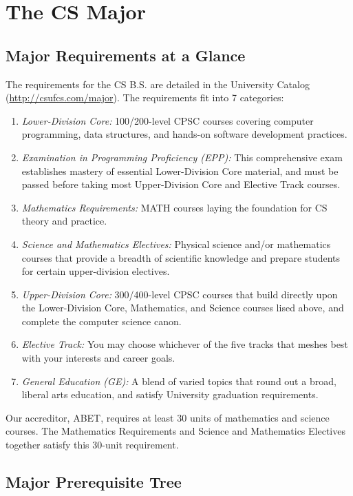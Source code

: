 \documentclass{book}
\newcommand{\shrunkurl}[1]{\url{http://csufcs.com/#1}}
\begin{document}
\chapter{The CS Major}

\section{Major Requirements at a Glance}

The requirements for the CS B.S. are detailed in the University Catalog (\shrunkurl{major}). The requirements fit into 7 categories:
\begin{enumerate}
\item \emph{Lower-Division Core:} 100/200-level CPSC courses covering computer programming, data structures, and hands-on software development practices.
\item \emph{Examination in Programming Proficiency (EPP):} This comprehensive exam establishes mastery of essential Lower-Division Core material, and must be passed before taking most Upper-Division Core and Elective Track courses. 
\item \emph{Mathematics Requirements:} MATH courses laying the foundation for CS theory and practice.
\item \emph{Science and Mathematics Electives:} Physical science and/or mathematics courses that provide a breadth of scientific knowledge and prepare students for certain upper-division electives.
\item \emph{Upper-Division Core:} 300/400-level CPSC courses that build directly upon the Lower-Division Core, Mathematics, and Science courses lised above, and complete the computer science canon.
\item \emph{Elective Track:} You may choose whichever of the five tracks that meshes best with your interests and career goals.
\item \emph{General Education (GE):} A blend of varied topics that round out a broad, liberal arts education, and satisfy University graduation requirements.
\end{enumerate}
  
Our accreditor, ABET, requires at least 30 units of mathematics and science courses. The Mathematics Requirements and Science and Mathematics Electives together satisfy this 30-unit requirement.

\section{Major Prerequisite Tree}
\label{section:major_prerequisite_tree}
\end{document}
